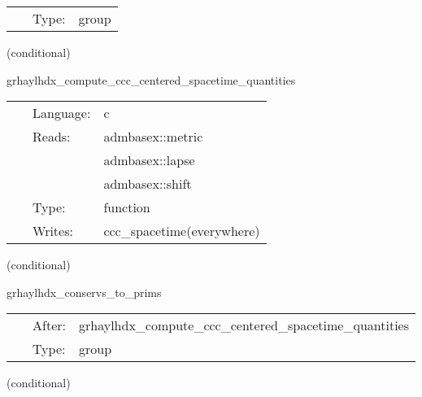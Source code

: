 \documentclass{article}
\begin{document}
\hspace{5mm}

 \begin{tabular*}{160mm}{cll} 
~ & Type:  & group \\ 
\end{tabular*} 


\vspace{5mm}

   (conditional) 

\hspace{5mm} grhaylhdx\_compute\_ccc\_centered\_spacetime\_quantities 

\hspace{5mm}{\it interpolate spacetime quantities to cell centers } 


\hspace{5mm}

 \begin{tabular*}{160mm}{cll} 
~ & Language:  & c \\ 
~ & Reads:  & admbasex::metric \\ 
~& ~ &admbasex::lapse\\ 
~& ~ &admbasex::shift\\ 
~ & Type:  & function \\ 
~ & Writes:  & ccc\_spacetime(everywhere) \\ 
\end{tabular*} 


\vspace{5mm}

   (conditional) 

\hspace{5mm} grhaylhdx\_conservs\_to\_prims 

\hspace{5mm}{\it compute primitive variables from conservatives } 


\hspace{5mm}

 \begin{tabular*}{160mm}{cll} 
~ & After:  & grhaylhdx\_compute\_ccc\_centered\_spacetime\_quantities \\ 
~ & Type:  & group \\ 
\end{tabular*} 


\vspace{5mm}

   (conditional) 
\end{document}
